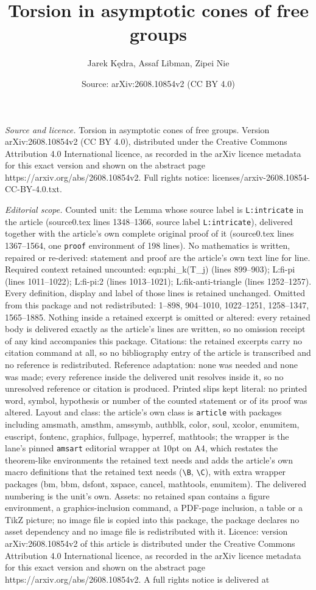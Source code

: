 \documentclass[10pt,a4paper]{amsart}
\title[Torsion in asymptotic cones of free groups]{Torsion in asymptotic cones of free groups}
\author{Jarek K\k{e}dra, Assaf Libman, Zipei Nie}
\date{Source: arXiv:2608.10854v2 (CC BY 4.0)}
\begin{document}
\maketitle

\noindent\emph{Source and licence.} Torsion in asymptotic cones of free groups. Version arXiv:2608.10854v2 (CC BY 4.0), distributed under the Creative Commons Attribution 4.0 International licence, as recorded in the arXiv licence metadata for this exact version and shown on the abstract page https://arxiv.org/abs/2608.10854v2. Full rights notice: licenses/arxiv-2608.10854-CC-BY-4.0.txt.\par\smallskip

\noindent\textit{Editorial scope.} Counted unit: the Lemma whose source label is \texttt{L:intricate} in the article (source0.tex lines 1348--1366, source label \texttt{L:intricate}), delivered together with the article's own complete original proof of it (source0.tex lines 1367--1564, one \texttt{proof} environment of 198 lines). No mathematics is written, repaired or re-derived: statement and proof are the article's own text line for line. Required context retained uncounted: eqn:phi\_k(T\_j) (lines 899--903); L:fi-pi (lines 1011--1022); L:fi-pi:2 (lines 1013--1021); L:fik-anti-triangle (lines 1252--1257). Every definition, display and label of those lines is retained unchanged. Omitted from this package and not redistributed: 1--898, 904--1010, 1022--1251, 1258--1347, 1565--1885. Nothing inside a retained excerpt is omitted or altered: every retained body is delivered exactly as the article's lines are written, so no omission receipt of any kind accompanies this package. Citations: the retained excerpts carry no citation command at all, so no bibliography entry of the article is transcribed and no reference is redistributed. Reference adaptation: none was needed and none was made; every reference inside the delivered unit resolves inside it, so no unresolved reference or citation is produced. Printed slips kept literal: no printed word, symbol, hypothesis or number of the counted statement or of its proof was altered. Layout and class: the article's own class is \texttt{article} with packages including amsmath, amsthm, amssymb, authblk, color, soul, xcolor, enumitem, euscript, fontenc, graphics, fullpage, hyperref, mathtools; the wrapper is the lane's pinned \texttt{amsart} editorial wrapper at 10pt on A4, which restates the theorem-like environments the retained text needs and adds the article's own macro definitions that the retained text needs (\texttt{\textbackslash B}, \texttt{\textbackslash C}), with extra wrapper packages (bm, bbm, dsfont, xspace, cancel, mathtools, enumitem). The delivered numbering is the unit's own. Assets: no retained span contains a figure environment, a graphics-inclusion command, a PDF-page inclusion, a table or a TikZ picture; no image file is copied into this package, the package declares no asset dependency and no image file is redistributed with it. Licence: version arXiv:2608.10854v2 of this article is distributed under the Creative Commons Attribution 4.0 International licence, as recorded in the arXiv licence metadata for this exact version and shown on the abstract page https://arxiv.org/abs/2608.10854v2. A full rights notice is delivered at 
\end{document}
